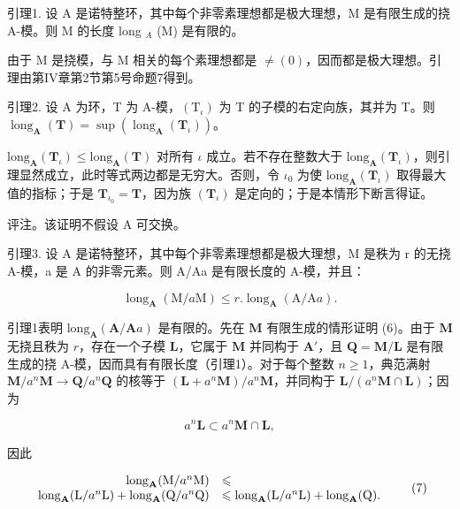 引理1. 设 A 是诺特整环，其中每个非零素理想都是极大理想，M 是有限生成的挠 A-模。则 M 的长度 long \(_{A}\) (M) 是有限的。

由于 M 是挠模，与 M 相关的每个素理想都是 \(\neq(0)\)，因而都是极大理想。引理由第IV章第2节第5号命题7得到。

引理2. 设 A 为环，T 为 A-模，\((\mathrm{T}_{\iota})\) 为 T 的子模的右定向族，其并为 T。则 \(\operatorname{long}_{\mathbf{A}}(\mathbf{T}) = \sup (\operatorname{long}_{\mathbf{A}}(\mathbf{T}_{\iota}))\)。

\(\text{long}_{\mathbf{A}}(\mathbf{T}_{\iota}) \leqslant \text{long}_{\mathbf{A}}(\mathbf{T})\) 对所有 \(\iota\) 成立。若不存在整数大于 \(\text{long}_{\mathbf{A}}(\mathbf{T}_{\iota})\)，则引理显然成立，此时等式两边都是无穷大。否则，令 \(\iota_{0}\) 为使 \(\text{long}_{\mathbf{A}}(\mathbf{T}_{\iota})\) 取得最大值的指标；于是 \(\mathbf{T}_{\iota_{0}} = \mathbf{T}\)，因为族 \((\mathbf{T}_{\iota})\) 是定向的；于是本情形下断言得证。

评注。该证明不假设 A 可交换。

引理3. 设 A 是诺特整环，其中每个非零素理想都是极大理想，M 是秩为 r 的无挠 A-模，a 是 A 的非零元素。则 A/Aa 是有限长度的 A-模，并且：

\[
\operatorname{long} _ {\mathbf {A}} (\mathrm{M} / a \mathrm{M}) \leqslant r. \operatorname{long} _ {\mathbf {A}} (\mathrm{A} / \mathrm{A} a).\tag{6}
\]

引理1表明 \(\mathrm{long}_{\mathbf{A}}(\mathbf{A} / \mathbf{A}a)\) 是有限的。先在 \(\mathbf{M}\) 有限生成的情形证明 (6)。由于 \(\mathbf{M}\) 无挠且秩为 \(r\)，存在一个子模 \(\mathbf{L}\)，它属于 \(\mathbf{M}\) 并同构于 \(\mathbf{A}'\)，且 \(\mathbf{Q} = \mathbf{M} / \mathbf{L}\) 是有限生成的挠 A-模，因而具有有限长度（引理1）。对于每个整数 \(n \geqslant 1\)，典范满射 \(\mathbf{M} / a^n\mathbf{M} \to \mathbf{Q} / a^n\mathbf{Q}\) 的核等于 \((\mathbf{L} + a^n\mathbf{M}) / a^n\mathbf{M}\)，并同构于 \(\mathbf{L} / (a^n\mathbf{M} \cap \mathbf{L})\)；因为

\[
a ^ {n} \mathbf {L} \subset a ^ {n} \mathbf {M} \cap \mathbf {L},
\]

因此

\[
\begin{array}{r l} \operatorname{long} _ {\mathbf {A}} (\mathrm{M} / a ^ {n} \mathrm{M}) & \leqslant \\ \operatorname{long} _ {\mathbf {A}} (\mathrm{L} / a ^ {n} \mathrm{L}) + \operatorname{long} _ {\mathbf {A}} (\mathrm{Q} / a ^ {n} \mathrm{Q}) & \leqslant \operatorname{long} _ {\mathbf {A}} (\mathrm{L} / a ^ {n} \mathrm{L}) + \operatorname{long} _ {\mathbf {A}} (\mathrm{Q}). \end{array} \tag {7}
\]

